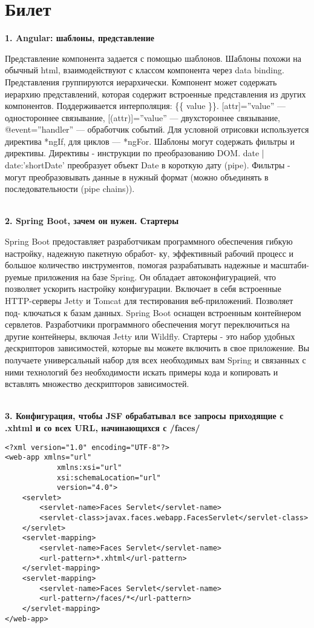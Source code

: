 \documentclass{article}
\newcommand{\bil}[5]{%
        \section{Билет}
        \textbf{1. #1}

        #4
        \\
        \textbf{2. #2}
        
        #5
        \\
        \textbf{3. #3}
}
\begin{document}
\bil{Angular: шаблоны, представление }
{Spring Boot, зачем он нужен. Стартеры}
{Конфигурация, чтобы JSF обрабатывал все запросы приходящие с .xhtml и со всех URL, начинающихся с /faces/}{
    Представление компонента задается с помощью шаблонов. 
    Шаблоны похожи на обычный html, взаимодействуют с классом компонента через data binding. 
    Представления группируются иерархически. Компонент может содержать иерархию представлений, которая содержит встроенные представления из других компонентов. 
    Поддерживается интерполяция: \{\{ value \}\}. [attr]=”value” — одностороннее связывание, [(attr)]=”value” — двухстороннее связывание, @event=”handler” — обработчик событий. 
    Для условной отрисовки используется директива *ngIf, для циклов — *ngFor. 
    Шаблоны могут содержать фильтры и директивы. 
    Директивы - инструкции по преобразованию DOM. 
    {{ date | date:'shortDate' }} преобразует объект Date в короткую дату (pipe).
    Фильтры - могут преобразовывать данные в нужный формат (можно объединять в последовательности (pipe chains)).
}{
    Spring Boot предоставляет разработчикам программного обеспечения гибкую настройку, надежную пакетную обработ-
ку, эффективный рабочий процесс и большое количество инструментов, помогая разрабатывать надежные и масштаби-
руемые приложения на базе Spring. Он обладает автоконфигурацией, что позволяет ускорить настройку конфигурации.
Включает в себя встроенные HTTP-серверы Jetty и Tomcat для тестирования веб-приложений. Позволяет под-
ключаться к базам данных.
Spring Boot оснащен встроенным контейнером сервлетов. Разработчики
программного обеспечения могут переключиться на другие контейнеры, включая Jetty или Wildfly.
Стартеры - это набор удобных дескрипторов зависимостей, которые вы можете включить в свое приложение. Вы получаете универсальный набор для всех необходимых вам Spring и связанных с ними технологий без необходимости искать примеры кода и копировать и вставлять множество дескрипторов зависимостей.
}
\begin{lstlisting}[frame=single, basicstyle=\ttfamily, breaklines=true, breakatwhitespace=true, postbreak=\mbox{\textcolor{red}{$\hookrightarrow$}\space}]
<?xml version="1.0" encoding="UTF-8"?>
<web-app xmlns="url"
            xmlns:xsi="url"
            xsi:schemaLocation="url"
            version="4.0">
    <servlet>
        <servlet-name>Faces Servlet</servlet-name>
        <servlet-class>javax.faces.webapp.FacesServlet</servlet-class>
    </servlet>
    <servlet-mapping>
        <servlet-name>Faces Servlet</servlet-name>
        <url-pattern>*.xhtml</url-pattern>
    </servlet-mapping>
    <servlet-mapping>
        <servlet-name>Faces Servlet</servlet-name>
        <url-pattern>/faces/*</url-pattern>
    </servlet-mapping>
</web-app>
    
\end{lstlisting}
\end{document}

